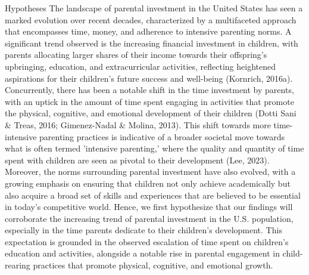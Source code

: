 Hypotheses
The landscape of parental investment in the United States has seen a marked evolution over recent decades, characterized by a multifaceted approach that encompasses time, money, and adherence to intensive parenting norms. A significant trend observed is the increasing financial investment in children, with parents allocating larger shares of their income towards their offspring's upbringing, education, and extracurricular activities, reflecting heightened aspirations for their children's future success and well-being (Kornrich, 2016a). Concurrently, there has been a notable shift in the time investment by parents, with an uptick in the amount of time spent engaging in activities that promote the physical, cognitive, and emotional development of their children (Dotti Sani & Treas, 2016; Gimenez-Nadal & Molina, 2013). This shift towards more time-intensive parenting practices is indicative of a broader societal move towards what is often termed 'intensive parenting,' where the quality and quantity of time spent with children are seen as pivotal to their development (Lee, 2023). Moreover, the norms surrounding parental investment have also evolved, with a growing emphasis on ensuring that children not only achieve academically but also acquire a broad set of skills and experiences that are believed to be essential in today's competitive world. Hence, we first hypothesize that our findings will corroborate the increasing trend of parental investment in the U.S. population, especially in the time parents dedicate to their children's development. This expectation is grounded in the observed escalation of time spent on children's education and activities, alongside a notable rise in parental engagement in child-rearing practices that promote physical, cognitive, and emotional growth.
